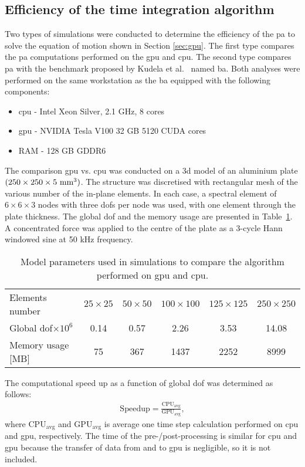 \subsection{Efficiency of the time integration algorithm}
Two types of simulations were conducted to determine the efficiency of the \ac{pa} to solve the equation of motion shown in Section \ref{sec:gpu}.
The first type compares the \ac{pa} computations performed on the \ac{gpu} and \ac{cpu}.
The second type compares \ac{pa} with the benchmark proposed by Kudela et al.~\cite{kudela2020parallel} named \ac{ba}.
Both analyses were performed on the same workstation as the \ac{ba} equipped with the following components:
\begin{itemize}
	\item \ac{cpu} - Intel Xeon Silver, 2.1 GHz, 8 cores
	\item \ac{gpu} - NVIDIA Tesla V100 32 GB 5120 CUDA cores
	\item RAM - 128 GB GDDR6
\end{itemize}

The comparison \ac{gpu} vs. \ac{cpu} was conducted on a \ac{3d} model of an  aluminium plate \((250\times250\times 5$ mm$^3)\).
The structure was discretised with rectangular mesh of the various number of the in-plane elements.
In each case, a spectral element of \(6\times 6\times 3\) nodes with three \acp{dof} per node was used, with one element through the plate thickness.
The global \ac{dof} and the memory usage are presented in Table~\ref{tab:gpuvscpu}.
A concentrated force was applied to the centre of the plate as a 3-cycle Hann windowed sine at 50 kHz frequency.
	\begin{table}[!b]
	\tabcolsep=0.25cm
	\centering
	\caption{\label{tab:gpuvscpu} Model parameters used in simulations to compare the algorithm performed on \ac{gpu} and \ac{cpu}.}
	\begin{tabular}{lccccc}
		\toprule
		Elements number & \(25\times25\) & \(50\times50\) & \(100\times100\) &\(125\times125\) &\(250\times250\) \\
		Global \ac{dof}\(\times10^6\) &0.14&0.57&2.26&3.53&14.08\\
		Memory usage [MB] & 75 & 367 & 1437 & 2252 & 8999\\ \bottomrule
	\end{tabular}
\end{table}
The computational speed up as a function of global \ac{dof} was determined as follows:
\begin{eqnarray}
\mathrm{Speedup} = \frac{\mathrm{CPU_{avg}}}{\mathrm{GPU_{avg}}},
\end{eqnarray}
where \(\mathrm{CPU_{avg}}\) and \(\mathrm{GPU_{avg}}\) is average one time step calculation performed on \ac{cpu} and \ac{gpu}, respectively.
The time of the pre-/post-processing is similar for \ac{cpu} and \ac{gpu} because the transfer of data from and to \ac{gpu} is negligible, so it is not included.

